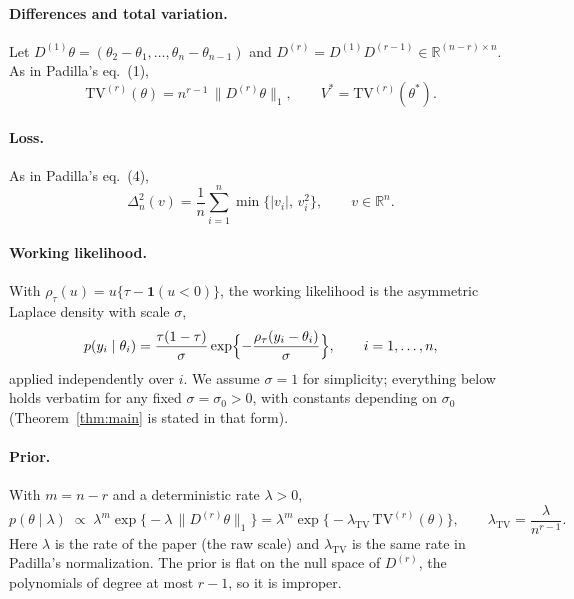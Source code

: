 \documentclass[11pt]{article}
\theoremstyle{definition}
\theoremstyle{remark}
\newcommand{\R}{\mathbb{R}}
\newcommand{\TV}{\mathrm{TV}}
\newcommand{\Dr}{D^{(r)}}
\newcommand{\lamtv}{\lambda_{\TV}}
\newcommand{\thetas}{\theta^{*}}
\begin{document}
\paragraph{Differences and total variation.} Let $D^{(1)}\theta=(\theta_2-\theta_1,\dots,\theta_n-\theta_{n-1})$ and $\Dr=D^{(1)}D^{(r-1)}\in\R^{(n-r)\times n}$. As in Padilla's eq.~(1),
\begin{equation}\label{eq:tv}
\TV^{(r)}(\theta)=n^{r-1}\,\|\Dr\theta\|_1,\qquad V^{*}=\TV^{(r)}(\thetas).
\end{equation}

\paragraph{Loss.} As in Padilla's eq.~(4),
\begin{equation}\label{eq:loss}
\Delta_n^2(v)=\frac1n\sum_{i=1}^n\min\{|v_i|,\,v_i^2\},\qquad v\in\R^n .
\end{equation}

\paragraph{Working likelihood.} With $\rho_\tau(u)=u\{\tau-\mathbf 1(u<0)\}$, the working likelihood is the asymmetric Laplace density with scale $\sigma$,
\begin{equation}\label{eq:ald}
p(y_i\mid\theta_i)=\frac{\tau(1-\tau)}{\sigma}\exp\Bigl\{-\frac{\rho_\tau(y_i-\theta_i)}{\sigma}\Bigr\},\qquad i=1,\dots,n,
\end{equation}
applied independently over $i$. We assume $\sigma=1$ for simplicity; everything below holds verbatim for any fixed $\sigma=\sigma_0>0$, with constants depending on $\sigma_0$ (Theorem~\ref{thm:main} is stated in that form).

\paragraph{Prior.} With $m=n-r$ and a deterministic rate $\lambda>0$,
\begin{equation}\label{eq:prior}
p(\theta\mid\lambda)\;\propto\;\lambda^{m}\exp\bigl\{-\lambda\,\|\Dr\theta\|_1\bigr\}
=\lambda^{m}\exp\bigl\{-\lamtv\,\TV^{(r)}(\theta)\bigr\},\qquad \lamtv=\frac{\lambda}{n^{r-1}} .
\end{equation}
Here $\lambda$ is the rate of the paper (the raw scale) and $\lamtv$ is the same rate in Padilla's normalization. The prior is flat on the null space of $\Dr$, the polynomials of degree at most $r-1$, so it is improper.
\end{document}
